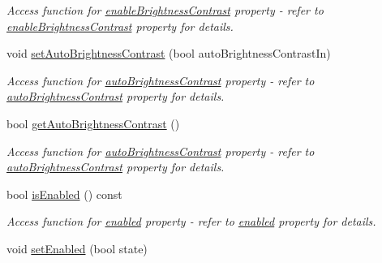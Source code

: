 \begin{DoxyCompactItemize}
\begin{DoxyCompactList}\small\item\em Access function for \hyperlink{classQEImage_a8d593efab178653a7275b78e22da4fdf}{enableBrightnessContrast} property -\/ refer to \hyperlink{classQEImage_a8d593efab178653a7275b78e22da4fdf}{enableBrightnessContrast} property for details. \end{DoxyCompactList}\item 
\hypertarget{classQEImage_adea03380d16e848e407b423e1361f139}{
void \hyperlink{classQEImage_adea03380d16e848e407b423e1361f139}{setAutoBrightnessContrast} (bool autoBrightnessContrastIn)}
\label{classQEImage_adea03380d16e848e407b423e1361f139}

\begin{DoxyCompactList}\small\item\em Access function for \hyperlink{classQEImage_a628f5be86f9bc38c167f21d740f7b86e}{autoBrightnessContrast} property -\/ refer to \hyperlink{classQEImage_a628f5be86f9bc38c167f21d740f7b86e}{autoBrightnessContrast} property for details. \end{DoxyCompactList}\item 
\hypertarget{classQEImage_aba31462e64fc385052c86ce4037c89ef}{
bool \hyperlink{classQEImage_aba31462e64fc385052c86ce4037c89ef}{getAutoBrightnessContrast} ()}
\label{classQEImage_aba31462e64fc385052c86ce4037c89ef}

\begin{DoxyCompactList}\small\item\em Access function for \hyperlink{classQEImage_a628f5be86f9bc38c167f21d740f7b86e}{autoBrightnessContrast} property -\/ refer to \hyperlink{classQEImage_a628f5be86f9bc38c167f21d740f7b86e}{autoBrightnessContrast} property for details. \end{DoxyCompactList}\item 
\hypertarget{classQEImage_aac2808388de0a0a8ad2402cf02484c16}{
bool \hyperlink{classQEImage_aac2808388de0a0a8ad2402cf02484c16}{isEnabled} () const }
\label{classQEImage_aac2808388de0a0a8ad2402cf02484c16}

\begin{DoxyCompactList}\small\item\em Access function for \hyperlink{classQEImage_aa7622e2272c1c1bdd0f51b6bfb9ec048}{enabled} property -\/ refer to \hyperlink{classQEImage_aa7622e2272c1c1bdd0f51b6bfb9ec048}{enabled} property for details. \end{DoxyCompactList}\item 
\hypertarget{classQEImage_a23e72fe6b2f37c53f6367d11b9ecb8dc}{
void \hyperlink{classQEImage_a23e72fe6b2f37c53f6367d11b9ecb8dc}{setEnabled} (bool state)}
\label{classQEImage_a23e72fe6b2f37c53f6367d11b9ecb8dc}


\end{DoxyCompactItemize}
